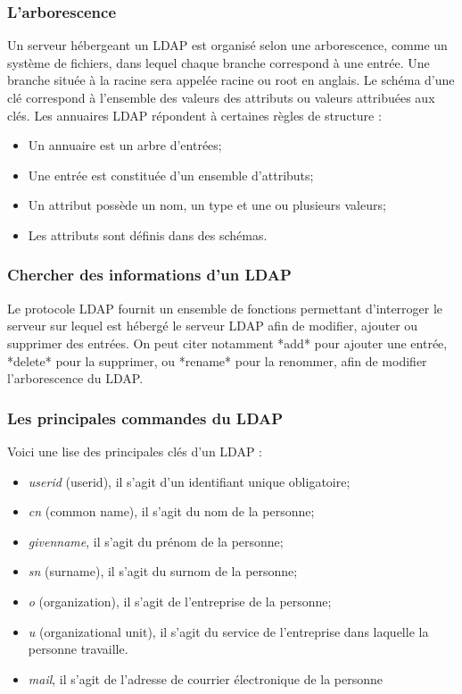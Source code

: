 \subsubsection{L'arborescence}

Un serveur hébergeant un LDAP est organisé selon une arborescence, comme un système de fichiers, dans lequel chaque branche
correspond à une entrée. Une branche située à la racine sera appelée racine ou root en anglais.
Le schéma d'une clé correspond à l'ensemble des valeurs des attributs ou valeurs attribuées aux clés.
Les annuaires LDAP répondent à certaines règles de structure :
\begin{itemize}
    \item Un annuaire est un arbre d'entrées;
    \item Une entrée est constituée d'un ensemble d'attributs;
    \item Un attribut possède un nom, un type et une ou plusieurs valeurs;
    \item Les attributs sont définis dans des schémas.
\end{itemize}


\subsubsection{Chercher des informations d'un LDAP}

Le protocole LDAP fournit un ensemble de fonctions permettant d'interroger le serveur sur lequel est hébergé
le serveur LDAP afin de modifier, ajouter ou supprimer des entrées. On peut citer notamment *add* pour ajouter une entrée,
 *delete* pour la supprimer, ou *rename* pour la renommer, afin de modifier l'arborescence du LDAP.
\subsubsection{Les principales commandes du LDAP}
Voici une lise des principales clés d'un LDAP :
\begin{itemize}
    \item \textit{userid} (userid), il s'agit d'un identifiant unique obligatoire;
    \item \textit{cn} (common name), il s'agit du nom de la personne;
    \item \textit{givenname}, il s'agit du prénom de la personne;
    \item \textit{sn} (surname), il s'agit du surnom de la personne;
    \item \textit{o} (organization), il s'agit de l'entreprise de la personne;
    \item \textit{u} (organizational unit), il s'agit du service de l'entreprise dans laquelle la personne travaille.
    \item \textit{mail}, il s'agit de l'adresse de courrier électronique de la personne
\end{itemize}

